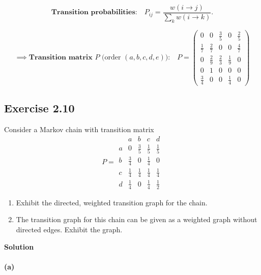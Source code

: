 \documentclass[hidelinks]{article}
\begin{document}
\[
\textbf{Transition probabilities:}\quad
P_{ij}=\frac{w(i\to j)}{\sum_{k} w(i\to k)}.
\]

\[
\implies \textbf{Transition matrix }P\text{ (order }(a,b,c,d,e)\text{):}\quad
P=
\begin{pmatrix}
0 & 0 & \frac{3}{5} & 0 & \frac{2}{5} \\[6pt]
\frac{1}{7} & \frac{2}{7} & 0 & 0 & \frac{4}{7} \\[6pt]
0 & \frac{2}{9} & \frac{2}{3} & \frac{1}{9} & 0 \\[6pt]
0 & 1 & 0 & 0 & 0 \\[6pt]
\frac{3}{4} & 0 & 0 & \frac{1}{4} & 0
\end{pmatrix}
\]

\subsection{Exercise 2.10} Consider a Markov chain with transition matrix
\[
P=
\begin{array}{c|cccc}
 & a & b & c & d\\ \hline
a & 0   & \frac{3}{5} & \frac{1}{5} & \frac{1}{5}\\
b & \frac{3}{4} & 0   & \frac{1}{4} & 0\\
c & \frac{1}{4} & \frac{1}{4} & \frac{1}{4} & \frac{1}{4}\\
d & \frac{1}{4} & 0   & \frac{1}{4} & \frac{1}{2}
\end{array}
\]

\begin{enumerate}
  \item[(a)] Exhibit the directed, weighted transition graph for the chain.
  \item[(b)] The transition graph for this chain can be given as a weighted graph without
  directed edges. Exhibit the graph.
\end{enumerate}

\noindent \textbf{Solution}

\paragraph{(a)}
\end{document}
